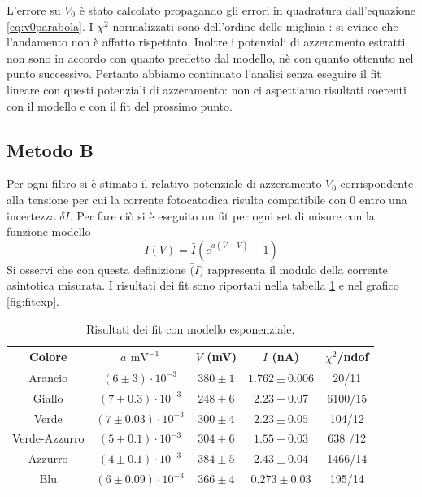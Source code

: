 \documentclass[10pt,a4paper]{article}
\begin{document}
L'errore su $V_0$ è stato calcolato propagando gli errori in quadratura dall'equazione \ref{eq:v0parabola}.
I $\chi ^2$ normalizzati sono dell'ordine delle migliaia : si evince che l'andamento non è affatto rispettato. Inoltre i potenziali di azzeramento estratti non sono in accordo con quanto predetto dal modello, nè con quanto ottenuto nel punto successivo. Pertanto  abbiamo continuato l'analisi senza eseguire il fit lineare con questi potenziali di azzeramento: non ci aspettiamo risultati coerenti con il modello e con il fit del prossimo punto.
\subsection{Metodo B}
Per ogni filtro si è stimato il relativo potenziale di azzeramento $V_0$ corrispondente alla tensione per cui la corrente fotocatodica risulta compatibile con 0 entro una incertezza $\delta I$. Per fare ciò si è eseguito un fit per ogni set di misure con la funzione modello
\begin{equation}\label{eq:fitexp}
I(V)=\bar{I}(e^{a(\bar{V}-V)}-1)
\end{equation}
Si osservi che con questa definizione $\bar(I)$ rappresenta il modulo della  corrente asintotica misurata.
I risultati dei fit sono riportati nella tabella \ref{tab:fitexp} e nel grafico \ref{fig:fitexp}.
\begin{table}[!htb]
\centering
\begin{tabular}{|c|c|c|c|c|}
\hline
Colore & $a$ $\mbox{mV}^{-1}$ &$\bar{V}$ (mV) & $\bar{I}$ (nA) & $\chi^2$/ndof\\
\hline
Arancio & $(6\pm 3)\cdot 10 ^{-3}$ & $380 \pm 1$ & $1.762\pm 0.006$ & 20/11\\
\hline
Giallo & $(7\pm 0.3) \cdot 10^{-3}$ & $248\pm 6$ & $2.23 \pm 0.07$ & 6100/15\\
\hline 
Verde & $(7 \pm 0.03)\cdot 10 ^ {-3}$ & $300 \pm 4$ & $2.23 \pm 0.05$ & 104/12 \\
\hline
Verde-Azzurro & $(5\pm 0.1)\cdot 10^{-3}$ & $304\pm 6$ & $1.55 \pm 0.03$ & 638 /12\\
\hline 
Azzurro & $(4 \pm 0.1)\cdot 10^{-3}$ & $384\pm 5$ & $2.43 \pm0.04$ & 1466/14\\
\hline
Blu & $(6\pm 0.09)\cdot 10^{-3} $ & $366\pm4$  &$0.273 \pm0.03$ & 195/14\\
\hline

\end{tabular}
\caption{Risultati dei fit con modello esponenziale.\label{tab:fitexp}}
\end{table}
\end{document}
